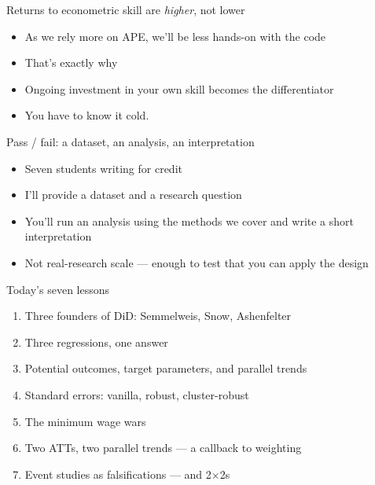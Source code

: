 \documentclass[aspectratio=169,11pt]{beamer}
\begin{document}
\begin{frame}{Returns to econometric skill are \textit{higher}, not lower}
\vspace{0.4em}
\begin{itemize}
  \item As we rely more on APE, we'll be less hands-on with the code
  \item That's exactly why 
  \item Ongoing investment in your own skill becomes the differentiator
  \item {} You have to know it cold.
\end{itemize}
\end{frame}

\begin{frame}{Pass / fail: a dataset, an analysis, an interpretation}
\vspace{0.5em}
\begin{itemize}
  \item Seven students writing for credit
  \item I'll provide a dataset and a research question
  \item You'll run an analysis using the methods we cover and write a short interpretation
  \item Not real-research scale --- enough to test that you can apply the design
\end{itemize}
\vspace{1em}
\end{frame}

\begin{frame}{Today's seven lessons}
\vspace{0.3em}
\begin{enumerate}
  \item Three founders of DiD: Semmelweis, Snow, Ashenfelter
  \item Three regressions, one answer
  \item Potential outcomes, target parameters, and parallel trends
  \item Standard errors: vanilla, robust, cluster-robust
  \item The minimum wage wars
  \item Two ATTs, two parallel trends --- a callback to weighting
  \item Event studies as falsifications --- and 2{$\times$}2s
\end{enumerate}
\end{frame}
\end{document}

